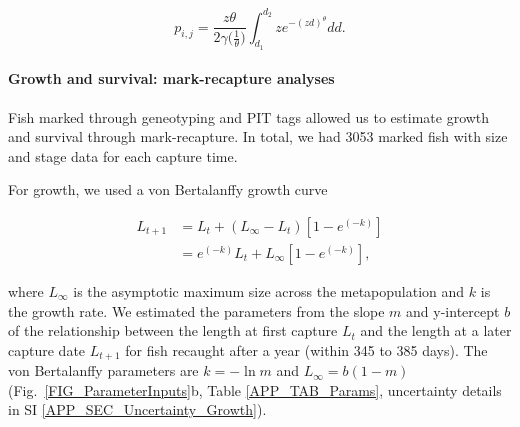 \documentclass[12pt, oneside]{article}   	%
\begin{document}
\begin{equation} %
p_{i,j} = \frac{z\theta}{2\gamma({\frac{1}{\theta})}} \int_{d_1}^{d_2} z e^{-(zd)^\theta}  dd. \label{EQN_integratingDK}
\end{equation}

\paragraph*{Growth and survival: mark-recapture analyses}

Fish marked through geneotyping and PIT tags allowed us to estimate growth and survival through mark-recapture. In total, we had 3053 marked fish with size and stage data for each capture time. 

For growth, we used a von Bertalanffy growth curve

\begin{equation} \label{EQN_VBL} 
\begin{split}
L_{t+1} & = L_t + (L_\infty - L_t)[1 - e^{(-k)}] \\
 & = e^{(-k)}L_t + L_\infty[1 - e^{(-k)}],
\end{split}
\end{equation}

where $L_\infty$ is the asymptotic maximum size across the metapopulation and $k$ is the growth rate. We estimated the parameters from the slope $m$ and y-intercept $b$ of the relationship between the length at first capture $L_t$ and the length at a later capture date $L_{t+1}$ for fish recaught after a year (within 345 to 385 days). The von Bertalanffy parameters are $k = -\ln m$ and $L_\infty = b(1-m)$ \citep{hart2009estimating} (Fig.\ \ref{FIG_ParameterInputs}b, Table \ref{APP_TAB_Params}, uncertainty details in SI \ref{APP_SEC_Uncertainty_Growth}).
\end{document}
